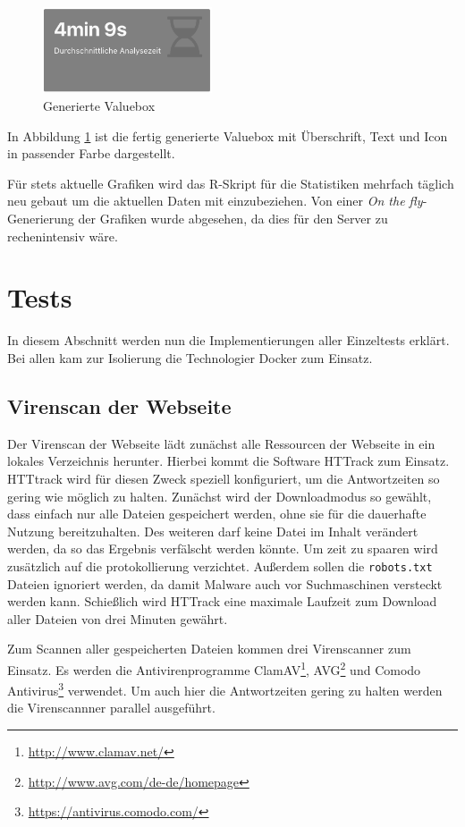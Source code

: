 \begin{figure}[H]
  \centering
  \includegraphics[width=5cm]{images/stats/valuebox}
  \caption{Generierte Valuebox}
  \label{fig:valuebox}
\end{figure}

In Abbildung \ref{fig:valuebox} ist die fertig generierte Valuebox mit Überschrift, Text und Icon in passender Farbe dargestellt.

Für stets aktuelle Grafiken wird das R-Skript für die Statistiken mehrfach täglich neu gebaut um die aktuellen Daten mit einzubeziehen. Von einer \textit{On the fly}-Generierung der Grafiken wurde abgesehen, da dies für den Server zu rechenintensiv wäre.

\section{Tests}

In diesem Abschnitt werden nun die Implementierungen aller Einzeltests erklärt. Bei allen kam zur Isolierung die Technologier Docker zum Einsatz.

\subsection{Virenscan der Webseite}

Der Virenscan der Webseite lädt zunächst alle Ressourcen der Webseite in ein lokales Verzeichnis herunter. Hierbei kommt die Software HTTrack zum Einsatz. HTTtrack wird für diesen Zweck speziell konfiguriert, um die Antwortzeiten so gering wie möglich zu halten. Zunächst wird der Downloadmodus so gewählt, dass einfach nur alle Dateien gespeichert werden, ohne sie für die dauerhafte Nutzung bereitzuhalten. Des weiteren darf keine Datei im Inhalt verändert werden, da so das Ergebnis verfälscht werden könnte. Um zeit zu spaaren wird zusätzlich auf die protokollierung verzichtet. Außerdem sollen die \lstinline[style=eclipse]{robots.txt} Dateien ignoriert werden, da damit Malware auch vor Suchmaschinen versteckt werden kann. Schießlich wird HTTrack eine maximale Laufzeit zum Download aller Dateien von drei Minuten gewährt.

Zum Scannen aller gespeicherten Dateien kommen drei Virenscanner zum Einsatz. Es werden die Antivirenprogramme ClamAV\footnote{\url{http://www.clamav.net/}}, AVG\footnote{\url{http://www.avg.com/de-de/homepage}} und Comodo Antivirus\footnote{\url{https://antivirus.comodo.com/}} verwendet. Um auch hier die Antwortzeiten gering zu halten werden die Virenscannner parallel ausgeführt.

